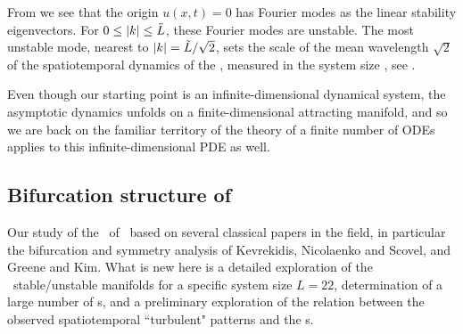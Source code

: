 From  we see that the origin $u(x,t) = 0$
has Fourier modes as the  linear
stability eigenvectors.
For $0 \leq |k| \leq \tilde{L}$, these Fourier modes are
unstable.
The most unstable mode, nearest to $|k|=\tilde{L}/\sqrt{2}$,
sets the scale of the mean wavelength $\sqrt{2}$
of the spatiotemporal dynamics of the {\KSe},
measured in the system size \tildeL, see .


%
%

Even though our starting point
is an infinite-dimensional dynamical system, the asymptotic dynamics
unfolds on a finite-dimensional attracting manifold, and so we are back on
the familiar territory of
the theory of a finite number of ODEs applies to this
infinite-dimensional PDE as well.

\subsection{Bifurcation structure of \KS}
\label{sec:KSlit}
%

Our study of the \eqva\ of
\KSe\ based on several classical papers in the field,
in particular the bifurcation and symmetry analysis of
Kevrekidis, Nicolaenko and Scovel,
and
Greene and Kim. What is new here is
a detailed exploration of the \eqva\ stable/unstable manifolds
for a specific system size $L = 22$, determination
of a large number of \rpo s, and a preliminary
exploration of the relation between the
observed spatiotemporal ``turbulent" patterns and
the \rpo s.


